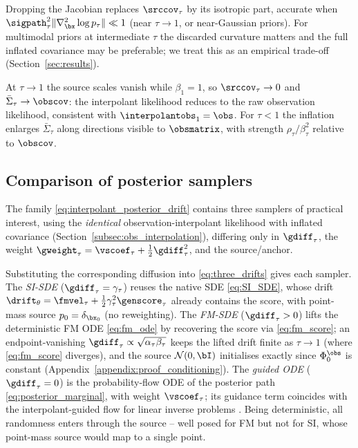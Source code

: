Dropping the Jacobian replaces $\srccov_\tau$ by its isotropic part, accurate when $\sigpath_\tau^2\|\nabla_{\bx}^2\log p_\tau\|\ll1$ (near $\tau\to1$, or near-Gaussian priors). For multimodal priors at intermediate $\tau$ the discarded curvature matters and the full inflated covariance may be preferable; we treat this as an empirical trade-off (Section~\ref{sec:results}).

\begin{remark}
At $\tau\to1$ the source scales vanish while $\beta_1=1$, so $\srccov_\tau\to0$ and $\bar{\Sigma}_\tau\to\obscov$: the interpolant likelihood reduces to the raw observation likelihood, consistent with $\interpolantobs_1=\obs$. For $\tau<1$ the inflation enlarges $\bar{\Sigma}_\tau$ along directions visible to $\obsmatrix$, with strength $\rho_\tau/\beta_\tau^2$ relative to $\obscov$.
\end{remark}

\subsection{Comparison of posterior samplers}
\label{subsec:summary_table}\label{subsec:supplying_diffusion}

The family \eqref{eq:interpolant_posterior_drift} contains three samplers of practical interest, using the \emph{identical} observation-interpolant likelihood with inflated covariance (Section~\ref{subsec:obs_interpolation}), differing only in $\gdiff_\tau$, the weight $\gweight_\tau=\vscoef_\tau+\tfrac12\gdiff_\tau^2$, and the source/anchor.

Substituting the corresponding diffusion into \eqref{eq:three_drifts} gives each sampler. The \emph{SI-SDE} ($\gdiff_\tau=\gamma_\tau$) reuses the native SDE \eqref{eq:SI_SDE}, whose drift $\drift_\theta=\fmvel_\tau+\tfrac12\gamma_\tau^2\genscore_\tau$ already contains the score, with point-mass source $p_0=\delta_{\bx_0}$ (no reweighting). The \emph{FM-SDE} ($\gdiff_\tau>0$) lifts the deterministic FM ODE \eqref{eq:fm_ode} by recovering the score via \eqref{eq:fm_score}; an endpoint-vanishing $\gdiff_\tau\propto\sqrt{\alpha_\tau\beta_\tau}$ keeps the lifted drift finite as $\tau\to1$ (where \eqref{eq:fm_score} diverges), and the source $\mathcal{N}(0,\bI)$ initialises exactly since $\Phi_0^{\obs}$ is constant (Appendix~\ref{appendix:proof_conditioning}). The \emph{guided ODE} ($\gdiff_\tau=0$) is the probability-flow ODE of the posterior path \eqref{eq:posterior_marginal}, with weight $\vscoef_\tau$; its guidance term coincides with the interpolant-guided flow for linear inverse problems \cite{yan_fig_2024, pokle_training-free_2024}. Being deterministic, all randomness enters through the source -- well posed for FM but not for SI, whose point-mass source would map to a single point.

